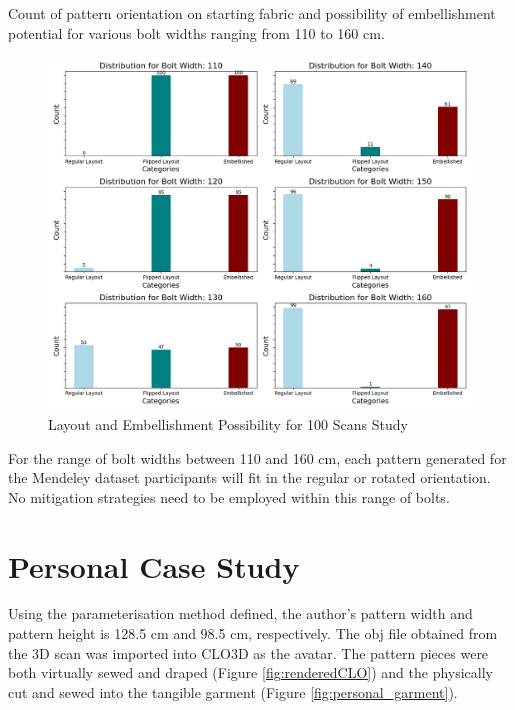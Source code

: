Count of pattern orientation on starting fabric and possibility of embellishment potential for various bolt widths ranging from 110 to 160 cm.
\begin{figure} [H]
    \centering
    \includegraphics[width = \textwidth]{Images/Mendeley_Bar.png}
    \caption{Layout and Embellishment Possibility for 100 Scans Study}
\end{figure}
For the range of bolt widths between 110 and 160 cm, each pattern generated for the Mendeley dataset participants will fit in the regular or rotated orientation. No mitigation strategies need to be employed within this range of bolts.


\section{Personal Case Study}
Using the parameterisation method defined, the author's pattern width and pattern height is 128.5 cm and 98.5 cm, respectively. The obj file obtained from the 3D scan was imported into CLO3D as the avatar. The pattern pieces were both virtually sewed and draped (Figure \ref{fig:renderedCLO}) and the physically cut and sewed into the tangible garment (Figure \ref{fig:personal_garment}).


